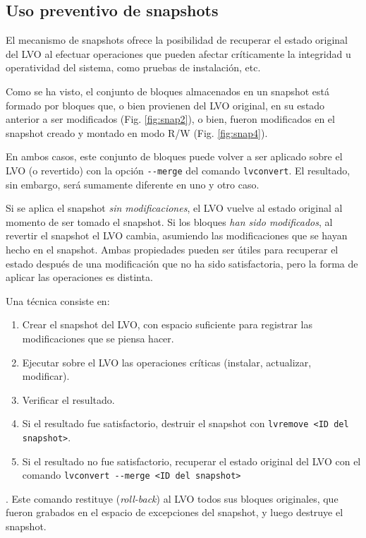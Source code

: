 \begin {comment}
--------------------------------------------
, en un momento en que el filesystem esté en estado consistente (por ejemplo, al arranque del sistema, mientras aún no ha sido montado, o mientras los servicios están administrativamente detenidos).
--------------------------------------------
\end{comment}

\subsection{Uso preventivo de snapshots}
El mecanismo de snapshots ofrece la posibilidad de recuperar el estado original del LVO al efectuar operaciones que pueden afectar críticamente la integridad u operatividad del sistema, como pruebas de instalación, etc. 


Como se ha visto, el conjunto de bloques almacenados en un snapshot está formado por bloques que, o bien provienen del LVO original, en su estado anterior a ser modificados (Fig. \ref{fig:snap2}), o bien, fueron modificados en el snapshot creado y montado en modo R/W (Fig. \ref{fig:snap4}). 

En ambos casos, este conjunto de bloques puede volver a ser aplicado sobre el LVO (o revertido) con la opción \lstinline$--merge$ del comando \lstinline$lvconvert$. El resultado, sin embargo, será sumamente diferente en uno y otro caso. 

Si se aplica el snapshot \emph{sin modificaciones}, el LVO vuelve al estado original al momento de ser tomado el snapshot. Si los bloques \emph{han sido modificados}, al revertir el snapshot el LVO cambia, asumiendo las modificaciones que se hayan hecho en el snapshot. Ambas propiedades pueden ser útiles para recuperar el estado después de una modificación que no ha sido satisfactoria, pero la forma de aplicar las operaciones es distinta.


Una técnica consiste en:

\begin{enumerate}
	\item Crear el snapshot del LVO, con espacio suficiente para registrar las modificaciones que se piensa hacer.
	\item Ejecutar sobre el LVO las operaciones críticas (instalar, actualizar, modificar).
	\item Verificar el resultado.
	\item Si el resultado fue satisfactorio, destruir el snapshot con \lstinline$lvremove <ID del snapshot>$.
	\item Si el resultado no fue satisfactorio, recuperar el estado original del LVO con el comando \lstinline$lvconvert --merge <ID del snapshot>$  
\end{enumerate}. Este comando restituye (\emph{roll-back}) al LVO todos sus bloques originales, que fueron grabados en el espacio de excepciones del snapshot, y luego destruye el snapshot.

